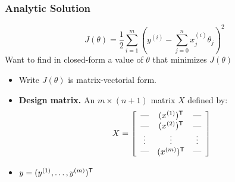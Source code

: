 \documentclass[xcolor=table]{beamer}
\newcommand{\trans}[1]{\ensuremath{#1}^{\scriptsize{\textsf{T}}}}
\begin{document}
\begin{frame}[t]
\frametitle{Analytic Solution}
\[J(\theta) = 
    \frac{1}{2} \sum_{i = 1}^{m} \left (y^{(i)} - \sum_{j = 0}^{n} x^{(i)}_j \theta_j \right )^2\]  
Want to find in closed-form a value of $\theta$ that minimizes $J(\theta)$ 

\begin{itemize}
    \item Write $J(\theta)$ is matrix-vectorial form.
    
    \pause

    \item \textbf{Design matrix.} An $m \times (n + 1)$ matrix $X$ defined by:
    \[
        X = \left [ \begin{array}{ccc}
                        \hbox{---} & \trans{(x^{(1)})} & \hbox{---} \\
                        \hbox{---} & \trans{(x^{(2)})} & \hbox{---} \\
                        \vdots     & \vdots                   & \vdots     \\
                        \hbox{---} & \trans{(x^{(m)})} & \hbox{---} \\
                   \end{array}
            \right ]
    \]

    \pause

    \item $y = \trans{(y^{(1)}, \ldots, y^{(m)})}$
\end{itemize}
\end{frame}
\end{document}
